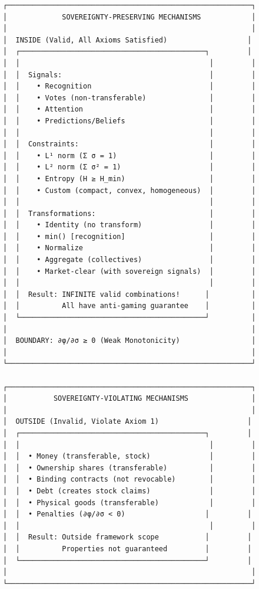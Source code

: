 \documentclass[11pt,a4paper]{article}
\theoremstyle{definition}
\theoremstyle{remark}
\begin{document}
\begin{center}
\begin{verbatim}
┌──────────────────────────────────────────────────────────┐
│             SOVEREIGNTY-PRESERVING MECHANISMS            │
│                                                          │
│  INSIDE (Valid, All Axioms Satisfied)                   │
│  ┌────────────────────────────────────────────┐         │
│  │                                             │         │
│  │  Signals:                                   │         │
│  │    • Recognition                            │         │
│  │    • Votes (non-transferable)               │         │
│  │    • Attention                              │         │
│  │    • Predictions/Beliefs                    │         │
│  │                                             │         │
│  │  Constraints:                               │         │
│  │    • L¹ norm (Σ σ = 1)                      │         │
│  │    • L² norm (Σ σ² = 1)                     │         │
│  │    • Entropy (H ≥ H_min)                    │         │
│  │    • Custom (compact, convex, homogeneous)  │         │
│  │                                             │         │
│  │  Transformations:                           │         │
│  │    • Identity (no transform)                │         │
│  │    • min() [recognition]                    │         │
│  │    • Normalize                              │         │
│  │    • Aggregate (collectives)                │         │
│  │    • Market-clear (with sovereign signals)  │         │
│  │                                             │         │
│  │  Result: INFINITE valid combinations!      │          │
│  │          All have anti-gaming guarantee    │          │
│  └────────────────────────────────────────────┘          │
│                                                          │
│  BOUNDARY: ∂φ/∂σ ≥ 0 (Weak Monotonicity)                 │
│                                                          │
└──────────────────────────────────────────────────────────┘

┌──────────────────────────────────────────────────────────┐
│           SOVEREIGNTY-VIOLATING MECHANISMS               │
│                                                          │
│  OUTSIDE (Invalid, Violate Axiom 1)                     │
│  ┌────────────────────────────────────────────┐         │
│  │                                             │         │
│  │  • Money (transferable, stock)              │         │
│  │  • Ownership shares (transferable)          │         │
│  │  • Binding contracts (not revocable)        │         │
│  │  • Debt (creates stock claims)              │         │
│  │  • Physical goods (transferable)            │         │
│  │  • Penalties (∂φ/∂σ < 0)                   │         │
│  │                                             │         │
│  │  Result: Outside framework scope           │         │
│  │          Properties not guaranteed         │         │
│  └────────────────────────────────────────────┘         │
│                                                          │
└──────────────────────────────────────────────────────────┘
\end{verbatim}
\end{center}
\end{document}
